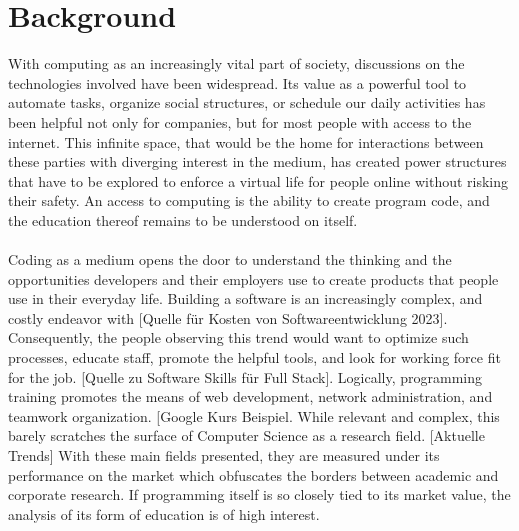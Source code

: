 \chapter{Background}
With computing as an increasingly vital part of society, discussions on the technologies involved have been widespread. Its value as a powerful tool to automate tasks, organize social structures, or schedule our daily activities has been helpful not only for companies, but for most people with access to the internet. This infinite space, that would be the home for interactions between these parties with diverging interest in the medium, has created power structures that have to be explored to enforce a virtual life for people online without risking their safety. An access to computing is the ability to create program code, and the education thereof remains to be understood on itself. \\ \\
Coding as a medium opens the door to understand the thinking and the opportunities developers and their employers use to create products that people use in their everyday life. Building a software is an increasingly complex, and costly endeavor with [Quelle für Kosten von Softwareentwicklung 2023]. Consequently, the people observing this trend would want to optimize such processes, educate staff, promote the helpful tools, and look for working force fit for the job. [Quelle zu Software Skills für Full Stack]. Logically, programming training promotes the means of web development, network administration, and teamwork organization. [Google Kurs Beispiel. While relevant and complex, this barely scratches the surface of Computer Science as a research field. [Aktuelle Trends] With these main fields presented, they are measured under its performance on the market which obfuscates the borders between academic and corporate research. If programming itself is so closely tied to its market value, the analysis of its form of education is of high interest. \\ \\

